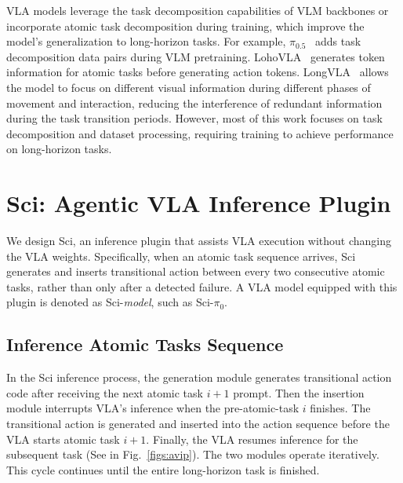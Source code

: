 \documentclass[letterpaper]{article} %
\begin{document}
VLA models leverage the task decomposition capabilities of VLM backbones or incorporate atomic task decomposition during training, which improve the model's generalization to long-horizon tasks. For example, $\pi_{0.5}$~\cite{black2025pi_} adds task decomposition data pairs during VLM pretraining.
LohoVLA~\cite{yang2025lohovla} generates token information for atomic tasks before generating action tokens. LongVLA~\cite{fan2025long} allows the model to focus on different visual information during different phases of movement and interaction, reducing the interference of redundant information during the task transition periods.
However, most of this work focuses on task decomposition and dataset processing, requiring training to achieve performance on long-horizon tasks.



\section{Sci: Agentic VLA Inference Plugin}
We design Sci, an inference plugin that assists VLA execution without changing the VLA weights. Specifically, when an atomic task sequence arrives, Sci generates and inserts transitional action between every two consecutive atomic tasks, rather than only after a detected failure. A VLA model equipped with this plugin is denoted as Sci-\emph{model}, such as Sci-$\pi_0$.


\subsection{Inference Atomic Tasks Sequence}
In the Sci inference process, the generation module generates transitional action code after receiving the next atomic task $i+1$ prompt.
Then the insertion module interrupts VLA's inference when the pre-atomic-task $i$ finishes.
The transitional action is generated and inserted into the action sequence before the VLA starts atomic task $i+1$.
Finally, the VLA resumes inference for the subsequent task (See in Fig.~\ref{figs:avip}).
The two modules operate iteratively. This cycle continues until the entire long-horizon task is finished.
\end{document}
